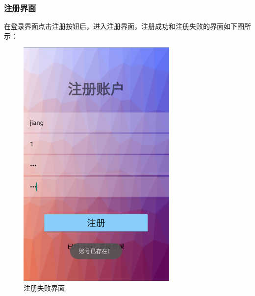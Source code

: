 \documentclass[UTF8,12pt]{article}
\begin{document}
\subsubsection{注册界面}
在登录界面点击注册按钮后，进入注册界面，注册成功和注册失败的界面如下图所示：

\begin{figure}[htbp]
    \begin{minipage}[t]{0.45\textwidth}
        \centering
        \includegraphics[width=0.7\textwidth]{imgs/32.png}
        \caption{注册失败界面}
    \end{minipage}%
    \begin{minipage}[t]{0.45\textwidth}
        \centering

\end{minipage}
\end{figure}
\end{document}
